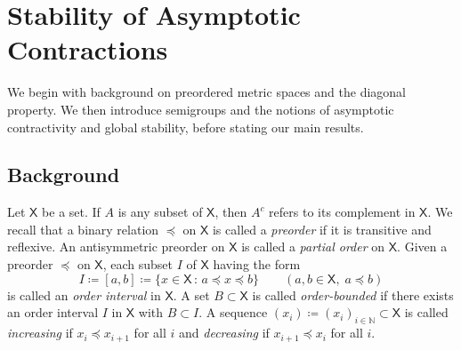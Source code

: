 \documentclass[12pt,reqno]{amsart}
\numberwithin{equation}{section}
\theoremstyle{definition}
\newcommand{\1}{\mathbbm{1}}
\newcommand{\NN}{\mathbb{N}}
\newcommand{\Xsf}{\mathsf{X}}
\newcommand{\navy}[1]{\textit{\textcolor{blue!40!black}{#1}}}
\begin{document}
%
%

\section{Stability of Asymptotic Contractions}\label{sec:prelim}

We begin with background on preordered metric spaces and the diagonal
property.  We then introduce semigroups and the notions of asymptotic
contractivity and global stability, before stating our main results.


\subsection{Background}

Let $\Xsf$ be a set.  If $A$ is any subset of $\Xsf$, then $A^c$ refers to its
complement in $\Xsf$. We recall that a binary relation $\preceq$
on $\Xsf$ is called a \navy{preorder} if it is transitive and
reflexive. An antisymmetric preorder on $\Xsf$ is called a \navy{partial order}
on $\Xsf$. Given a preorder $\preceq$ on $\Xsf$, each subset $I$ of $\Xsf$
having the form
%
\begin{equation*}
    I \coloneq [a, b] \coloneq \{x \in \Xsf \, : \, a \preceq x \preceq b\}
    \qquad (a, b \in \Xsf,\; a \preceq b)
\end{equation*}
%
is called an \navy{order interval} in $\Xsf$.
A set $B \subset \Xsf$ is called \navy{order-bounded} if there exists an order
interval $I$ in $\Xsf$ with $B \subset I$.
A sequence $(x_i) \coloneq (x_i)_{i \in \NN} \subset \Xsf$ is
called \navy{increasing} if $x_i \preceq x_{i+1}$ for all $i$ and
\navy{decreasing} if $x_{i+1} \preceq x_i$ for all $i$.
\end{document}
